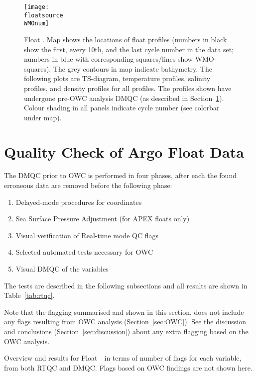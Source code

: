 \documentclass{article}
\begin{document}
\begin{figure}[H]
  \centerline{\texttt{[image: \\floatsource\\WMOnum]}}
  \caption{Float \WMOnum. Map shows the locations of float profiles (numbers in
    black show the first, every 10th, and the last cycle number in the data
    set; numbers in blue with corresponding squares/lines show
    WMO-squares). The grey contours in map indicate bathymetry. The
    following plots are TS-diagram, temperature profiles, salinity
    profiles, and density profiles for all profiles. The profiles shown
    have undergone pre-OWC analysis DMQC (as described in
    Section~\protect\ref{DMQCpreOWC}).  Colour shading in all panels
    indicate cycle number (see colorbar under map).}
  \label{fig:float-info}
\end{figure} 
 
        
\newpage
\section{Quality Check of Argo Float Data}\label{DMQCpreOWC}
%
The DMQC prior to OWC is performed in four phases, after each the found
erroneous data are removed before the following phase:
\begin{enumerate}
\item Delayed-mode procedures for coordinates
\item Sea Surface Pressure Adjustment (for APEX floats only)
\item Visual verification of Real-time mode QC flags
\item Selected automated tests necessary for OWC
\item Visual DMQC of the variables
\end{enumerate}
The tests are described in the following subsections and all results are shown in Table~\ref{tab:rtqc}. 

%
Note that the flagging summarised and shown in this section, does not
include any flags resulting from OWC analysis (Section~\ref{sec:OWC}). See
the discussion and conclusions (Section~\ref{sec:discussion}) about any
extra flagging based on the OWC analysis.
%
\begin{table}[!ht]
  \caption{Overview and results for Float~\WMOnum\ in terms of number of
    flags for each variable, from both RTQC and DMQC. 
    Flags based on OWC findings are not shown here.}
  \label{tab:rtqc}
  \centering
  
\end{table}     
\end{document}
